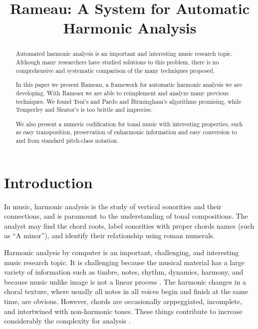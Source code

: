 \documentclass{article}
\title{Rameau: A System for Automatic Harmonic Analysis}
\begin{document}
\graphicspath{{figs/}{data/}}
\maketitle

\begin{abstract}

  Automated harmonic analysis is an important and interesting music
  research topic. Although many researchers have studied solutions to
  this problem, there is no comprehensive and systematic comparison of
  the many techniques proposed.

  In this paper we present Rameau, a framework for automatic harmonic
  analysis we are developing. With Rameau we are able to reimplement
  and analyze many previous techniques. We found Tsui's
  \cite{tsui:harmonic} and Pardo and Birmingham's
  \cite{pardo.ea:automated-report} algorithms promising, while
  Temperley and Sleator's \cite{temperley.ea:modeling} is too brittle
  and imprecise. 

  We also present a numeric codification for tonal music with
  interesting properties, such as easy transposition, preservation of
  enharmonic information and easy conversion to and from standard
  pitch-class notation.

\end{abstract}

\section{Introduction}
\label{sec:introduction}

In music, harmonic analysis is the study of vertical sonorities and
their connections, and is paramount to the understanding of tonal
compositions. The analyst may find the chord roots, label
sonorities with proper chords names (such as ``A minor''), and
identify their relationship using roman numerals.

Harmonic analysis by computer is an important, challenging, and
interesting music research topic. It is challenging because the
musical material has a large variety of information such as timbre,
notes, rhythm, dynamics, harmony, and because music unlike image is not a
linear process \cite{mouton.ea:numeric}. The harmonic changes in a choral
texture, where usually all notes in all voices begin and finish at the
same time, are obvious. However, chords are occasionally arppeggiated,
incomplete, and intertwined with non-harmonic tones. These things
contribute to increase considerably the complexity for analysis
\cite{pardo.ea:automated}.
\end{document}
